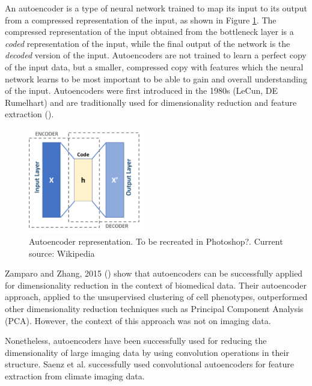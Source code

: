 An autoencoder is a type of neural network trained to map its input to its output from a compressed representation of the input, as shown in Figure \ref{fig:autoencoder}. The compressed representation of the input obtained from the bottleneck layer is a \textit{coded} representation of the input, while the final output of the network is the \textit{decoded} version of the input. Autoencoders are not trained to learn a perfect copy of the input data, but a smaller, compressed copy with features which the neural network learns to be most important to be able to gain and overall understanding of the input. Autoencoders were first introduced in the 1980s (LeCun, DE Rumelhart) and are traditionally used for dimensionality reduction and feature extraction (\cite{http://www.deeplearningbook.org/contents/autoencoders.html}).

\begin{figure}[h!]
    \centering
    \includegraphics[width=0.45\textwidth]{dissertation/figures/autoencoder_schema.png}
    \caption{Autoencoder representation. To be recreated in Photoshop?. Current source: Wikipedia}
    \label{fig:autoencoder}
\end{figure}

Zamparo and Zhang, 2015 (\cite{https://arxiv.org/pdf/1501.01348.pdf}) show that autoencoders can be successfully applied for dimensionality reduction in the context of biomedical data. Their autoencoder approach, applied to the unsupervised clustering of cell phenotypes, outperformed other dimensionality reduction techniques such as Principal Component Analysis (PCA). However, the context of this approach was not on imaging data.

Nonetheless, autoencoders have been successfully used for reducing the dimensionality of large imaging data by using convolution operations in their structure. Saenz et al. successfully used convolutional autoencoders for feature extraction from climate imaging data. %

